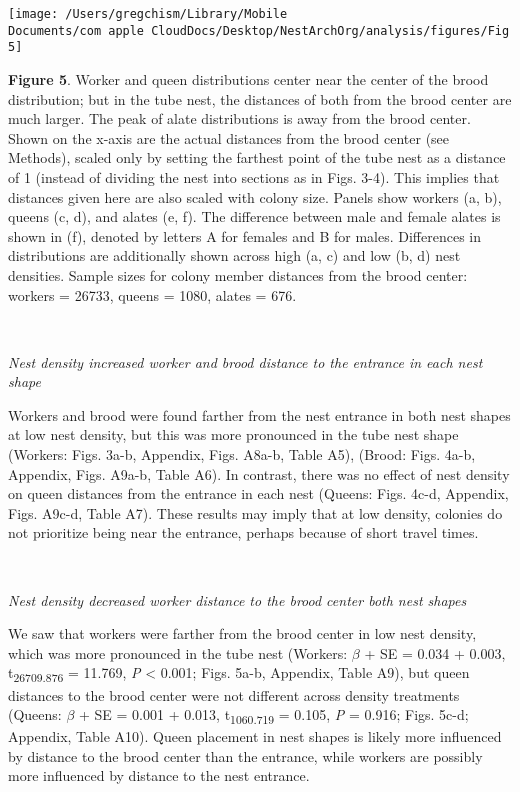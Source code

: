 \documentclass[3p]{elsarticle} %
\begin{document}
\begin{flushleft}\texttt{[image: /Users/gregchism/Library/Mobile Documents/com~apple~CloudDocs/Desktop/NestArchOrg/analysis/figures/Fig5]} \end{flushleft}

\textbf{Figure 5}. Worker and queen distributions center near the center
of the brood distribution; but in the tube nest, the distances of both
from the brood center are much larger. The peak of alate distributions
is away from the brood center. Shown on the x-axis are the actual
distances from the brood center (see Methods), scaled only by setting
the farthest point of the tube nest as a distance of 1 (instead of
dividing the nest into sections as in Figs. 3-4). This implies that
distances given here are also scaled with colony size. Panels show
workers (a, b), queens (c, d), and alates (e, f). The difference between
male and female alates is shown in (f), denoted by letters A for females
and B for males. Differences in distributions are additionally shown
across high (a, c) and low (b, d) nest densities. Sample sizes for
colony member distances from the brood center: workers = 26733, queens =
1080, alates = 676.

~

\emph{Nest density increased worker and brood distance to the entrance
in each nest shape}

Workers and brood were found farther from the nest entrance in both nest
shapes at low nest density, but this was more pronounced in the tube
nest shape (Workers: Figs. 3a-b, Appendix, Figs. A8a-b, Table A5),
(Brood: Figs. 4a-b, Appendix, Figs. A9a-b, Table A6). In contrast, there
was no effect of nest density on queen distances from the entrance in
each nest (Queens: Figs. 4c-d, Appendix, Figs. A9c-d, Table A7). These
results may imply that at low density, colonies do not prioritize being
near the entrance, perhaps because of short travel times.

~

\emph{Nest density decreased worker distance to the brood center both
nest shapes}

We saw that workers were farther from the brood center in low nest
density, which was more pronounced in the tube nest (Workers: \(\beta\)
+ SE = 0.034 + 0.003, t\textsubscript{26709.876} = 11.769, \emph{P}
\textless{} 0.001; Figs. 5a-b, Appendix, Table A9), but queen distances
to the brood center were not different across density treatments
(Queens: \(\beta\) + SE = 0.001 + 0.013, t\textsubscript{1060.719} =
0.105, \emph{P} = 0.916; Figs. 5c-d; Appendix, Table A10). Queen
placement in nest shapes is likely more influenced by distance to the
brood center than the entrance, while workers are possibly more
influenced by distance to the nest entrance.
\end{document}
